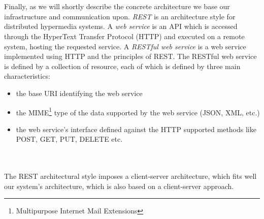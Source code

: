 \\\\
Finally, as we will shortly describe the concrete architecture we base our infrastructure and communication upon. \emph{REST} is an architecture style for distributed hypermedia systems. A \emph{web service} is an API which is accessed through the HyperText Transfer Protocol (HTTP) and executed on a remote system, hosting the requested service. A \emph{RESTful web service} is a web service implemented using HTTP and the principles of REST. The RESTful web service is defined by a collection of resource, each of which is defined by three main characteristics:
\begin{itemize}
  \item the base URI identifying the web service
  \item the MIME\footnote{Multipurpose Internet Mail Extensions} type of the
  data supported by the web service (JSON, XML, etc.)
  \item the web service's interface defined against the HTTP supported methods
  like POST, GET, PUT, DELETE etc.
\end{itemize}
\\\\
The REST architectural style imposes a client-server architecture, which fits well our system's architecture, which is also based on a client-server approach.

